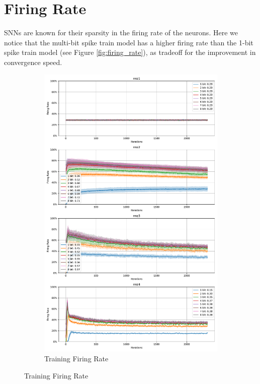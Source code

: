 \section{Firing Rate}
\label{sec:firing-rate}
    SNNs are known for their sparsity in the firing rate of the neurons. Here we notice that the multi-bit spike train model has a higher firing rate than the 1-bit spike train model (see Figure \ref{fig:firing_rate}), as tradeoff for the improvement in convergence speed. 
    \begin{figure}[!htpb]
        \centering
        \begin{subfigure}[H]{0.9\textwidth}
            \centering
            \includegraphics[width=\textwidth]{../standard/FashionMNIST/plots/fashionmnist_train_firerate.pdf}
            \caption{Training Firing Rate}
        \end{subfigure}
    \end{figure}
